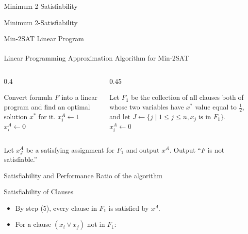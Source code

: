 \documentclass[xcolor=svgnames]{beamer}
\newcounter{enumstate}
\newcommand{\Staten}{\item[\textbf{Step \theenumstate:}]\stepcounter{enumstate}}%
\begin{document}
\begin{section}{Minimum 2-Satisfiability}
\begin{frame}{Minimum 2-Satisfiability}
\begin{exampleblock}{Min-2SAT Linear Program}
\[\begin{array}{lll}
                \end{array}
            \]
        \end{exampleblock}
    \end{frame}
    \begin{frame}{Linear Programming Approximation Algorithm for Min-2SAT}
    \small
    \begin{algorithmic}
    \begin{columns}
        \begin{column}
            {0.4\textwidth}
            \setcounter{enumstate}{1}
            \Staten Convert formula $F$ into a linear program and find an optimal solution $x^*$ for it.
                    \State $x^A_i \gets 1$
                    \State $x^A_i \gets 0$
                \EndIf
            \EndFor
        \end{column}
        \pause
        \begin{column}
            {0.45\textwidth}
            \setcounter{enumstate}{3}
            \Staten Let $F_1$ be the collection of all clauses both of whose two variables have $x^*$ value equal to $\frac{1}{2}$, and let $J \gets \{j \mid 1 \leq j \leq n, x_j \text{ is in } F_1\}$.
                    \State $x^A_i \gets 0$
                \EndIf
            \EndFor
        \end{column}
        \end{columns}
        \pause
        \vspace{10pt}
                \State Let $x^A_J$ be a satisfying assignment for $F_1$ and output $x^A$.
            \Else
                \State Output ``$F$ is not satisfiable.''
            \EndIf
        \end{algorithmic}
    \end{frame}
    \begin{frame}{Satisfiability and Performance Ratio of the algorithm}
        \begin{block}{Satisfiability of Clauses}
            \begin{itemize}
                \item By step (5), every clause in $F_1$ is satisfied by $x^A$.
                \item For a clause $(x_i \lor x_j)$ not in $F_1$:
                \begin{itemize}

\end{itemize}
\end{itemize}
\end{block}
\end{frame}
\end{section}
\end{document}
